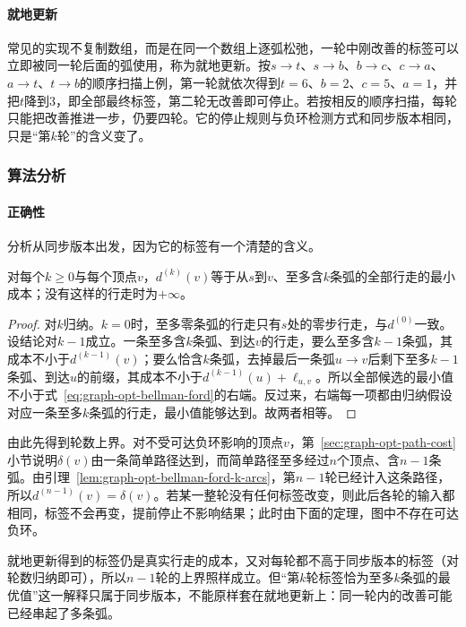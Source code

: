 \paragraph{就地更新}
常见的实现不复制数组，而是在同一个数组上逐弧松弛，一轮中刚改善的标签可以立即被同一轮后面的弧使用，称为就地更新。按$s\to t$、$s\to b$、$b\to c$、$c\to a$、$a\to t$、$t\to b$的顺序扫描上例，第一轮就依次得到$t=6$、$b=2$、$c=5$、$a=1$，并把$t$降到$3$，即全部最终标签，第二轮无改善即可停止。若按相反的顺序扫描，每轮只能把改善推进一步，仍要四轮。它的停止规则与负环检测方式和同步版本相同，只是“第$k$轮”的含义变了。

\subsubsection{算法分析}

\paragraph{正确性}
分析从同步版本出发，因为它的标签有一个清楚的含义。

\begin{lemma}[同步标签的含义]
\label{lem:graph-opt-bellman-ford-k-arcs}
对每个$k\geq0$与每个顶点$v$，$d^{(k)}(v)$等于从$s$到$v$、至多含$k$条弧的全部行走的最小成本；没有这样的行走时为$+\infty$。
\end{lemma}

\begin{proof}
对$k$归纳。$k=0$时，至多零条弧的行走只有$s$处的零步行走，与$d^{(0)}$一致。设结论对$k-1$成立。一条至多含$k$条弧、到达$v$的行走，要么至多含$k-1$条弧，其成本不小于$d^{(k-1)}(v)$；要么恰含$k$条弧，去掉最后一条弧$u\to v$后剩下至多$k-1$条弧、到达$u$的前缀，其成本不小于$d^{(k-1)}(u)+\ell_{u,v}$。所以全部候选的最小值不小于式~\eqref{eq:graph-opt-bellman-ford}的右端。反过来，右端每一项都由归纳假设对应一条至多$k$条弧的行走，最小值能够达到。故两者相等。
\end{proof}

由此先得到轮数上界。对不受可达负环影响的顶点$v$，第~\ref{sec:graph-opt-path-cost}小节说明$\delta(v)$由一条简单路径达到，而简单路径至多经过$n$个顶点、含$n-1$条弧。由引理~\ref{lem:graph-opt-bellman-ford-k-arcs}，第$n-1$轮已经计入这条路径，所以$d^{(n-1)}(v)=\delta(v)$。若某一整轮没有任何标签改变，则此后各轮的输入都相同，标签不会再变，提前停止不影响结果；此时由下面的定理，图中不存在可达负环。

就地更新得到的标签仍是真实行走的成本，又对每轮都不高于同步版本的标签（对轮数归纳即可），所以$n-1$轮的上界照样成立。但“第$k$轮标签恰为至多$k$条弧的最优值”这一解释只属于同步版本，不能原样套在就地更新上：同一轮内的改善可能已经串起了多条弧。

